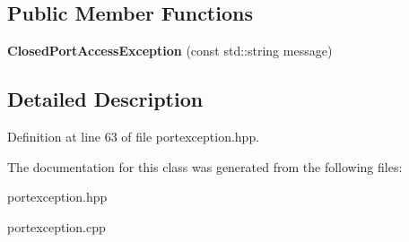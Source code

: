 \subsection*{Public Member Functions}
\begin{DoxyCompactItemize}
\item 
\hypertarget{class_closed_port_access_exception_aa66df922ca194ecd6431bd9cae0a4b24}{}\label{class_closed_port_access_exception_aa66df922ca194ecd6431bd9cae0a4b24} 
{\bfseries Closed\+Port\+Access\+Exception} (const std\+::string message)
\end{DoxyCompactItemize}


\subsection{Detailed Description}


Definition at line 63 of file portexception.\+hpp.



The documentation for this class was generated from the following files\+:\begin{DoxyCompactItemize}
\item 
portexception.\+hpp\item 
portexception.\+cpp\end{DoxyCompactItemize}
